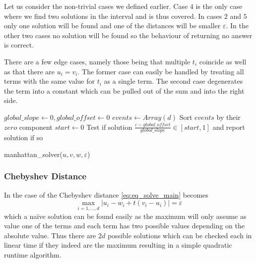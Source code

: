 Let us consider the non-trivial cases we defined earlier. Case \(4\) is the only case where we find two solutions in the interval and is thus covered. In cases \(2\) and \(5\) only one solution will be found and one of the distances will be smaller \(\varepsilon\). In the other two cases no solution will be found so the behaviour of returning no answer is correct.

There are a few edge cases, namely those being that multiple \(t_i\) coincide as well as that there are \(u_i = v_i\). The former case can easily be handled by treating all terms with the same value for \(t_i\) as a single term. The second case degenerates the term into a constant which can be pulled out of the sum and into the right side.

\begin{algorithm}[ht]
  \DontPrintSemicolon
  \BlankLine
  \(global\_slope \gets 0, global\_offset \gets 0\) \;
  \(events \gets Array(d)\)
  Sort \(events\) by their \(zero\) component\;
  \(start \gets 0\)\;
  Test if solution \(\frac{\varepsilon - global\_offset}{global\_slope} \in [start, 1]\) and report solution if so\;

  \caption{manhattan\_solver(\(u, v, w, \varepsilon\))}
  \label{algo:solve_manhattan}
\end{algorithm}


\subsubsection{Chebyshev Distance}
\label{subsubsec:eq_chebyshev_distance}
In the case of the Chebyshev distance \cref{eq:eq_solve_main} becomes 
\begin{equation}
  \max_{i = 1,\dots, d} |u_i - w_i + t(v_i - u_i)| = \varepsilon\label{eq:solve_chebyshev}
\end{equation}
which a na\"ive solution can be found easily as the maximum will only assume as value one of the terms and each term has two possible values depending on the absolute value. Thus there are \(2d\) possible solutions which can be checked each in linear time if they indeed are the maximum resulting in a simple quadratic runtime algorithm. 

